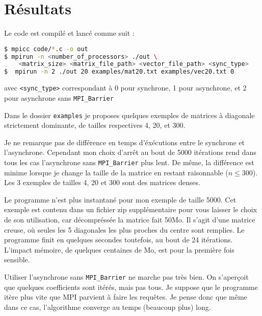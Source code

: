 \documentclass[11pt, a4paper]{article}
\begin{document}
\section{Résultats}

Le code est compilé et lancé comme suit :
\begin{lstlisting}[language=bash, keywordstyle=\color{black}\bf]
$ mpicc code/*.c -o out
$ mpirun -n <number_of_processors> ./out \
    <matrix_size> <matrix_file_path> <vector_file_path> <sync_type>
$  mpirun -n 2 ./out 20 examples/mat20.txt examples/vec20.txt 0
\end{lstlisting}

avec \lstinline{<sync_type>} correspondant à 0 pour synchrone, 1 pour asynchrone,
et 2 pour asynchrone sans \lstinline{MPI_Barrier}

\bigskip

Dans le dossier \texttt{examples} je proposes quelques exemples de matrices à diagonale strictement dominante, de tailles respectives 4, 20, et 300.

Je ne remarque pas de différence en temps d'éxécutions entre le synchrone et l'asynchrone. Cependant mon choix d'arrêt au bout de 5000 itérations rend dans tous les cas l'asynchrone sans \lstinline{MPI_Barrier} plus lent.
De même, la différence est minime lorsque je change la taille de la matrice en restant raisonnable (\(n \leq 300\)).
Les 3 exemples de tailles 4, 20 et 300 sont des matrices denses.

Le programme n'est plus instantané pour mon exemple de taille 5000.
Cet exemple est contenu dans un fichier zip supplémentaire pour vous laisser le choix de son utilisation, car décompréssée la matrice fait 50Mo.
Il s'agit d'une matrice creuse, où seules les 5 diagonales les plus proches du
centre sont remplies. Le programme finit en quelques secondes toutefois, au bout de 24 itérations.
L'impact mémoire, de quelques centaines de Mo, est pour la première fois sensible.

\bigskip

Utiliser l'asynchrone sans \lstinline{MPI_Barrier} ne marche pas très bien.
On s'aperçoit que quelques coefficients sont itérés, mais pas tous.
Je suppose que le programme itère plus vite que MPI parvient à faire les requêtes.
Je pense donc que même dans ce cas, l'algorithme converge au temps (beaucoup plus) long.
\end{document}
